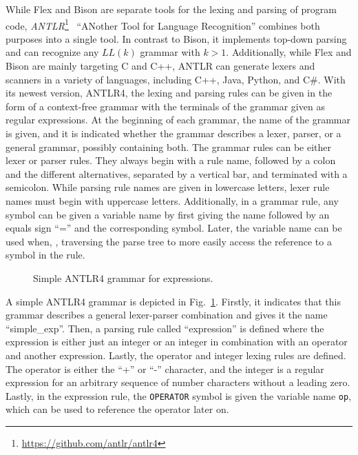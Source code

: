 While Flex and Bison are separate tools for the lexing and parsing of program code, \emph{ANTLR}\footnote{\url{https://github.com/antlr/antlr4}}~\cite{PaQu95} ``ANother Tool for Language Recognition'' combines both purposes into a single tool. In contrast to Bison, it implements top-down parsing and can recognize any $LL(k)$ grammar with $k > 1$. Additionally, while Flex and Bison are mainly targeting C and C++, ANTLR can generate lexers and scanners in a variety of languages, including C++, Java, Python, and C\#.
With its newest version, ANTLR4, the lexing and parsing rules can be given in the form of a context-free grammar with the terminals of the grammar given as regular expressions. At the beginning of each grammar, the name of the grammar is given, and it is indicated whether the grammar describes a lexer, parser, or a general grammar, possibly containing both. The grammar rules can be either lexer or parser rules. They always begin with a rule name, followed by a colon and the different alternatives, separated by a vertical bar, and terminated with a semicolon. While parsing rule names are given in lowercase letters, lexer rule names must begin with uppercase letters.
Additionally, in a grammar rule, any symbol can be given a variable name by first giving the name followed by an equals sign ``='' and the corresponding symbol. Later, the variable name can be used when, \eg, traversing the parse tree to more easily access the reference to a symbol in the rule.

\begin{figure}[htp]
    \centering
    
    \caption{Simple ANTLR4 grammar for expressions.}
    \label{fig:example_antlr4}
\end{figure}

A simple ANTLR4 grammar is depicted in Fig.~\ref{fig:example_antlr4}. Firstly, it indicates that this grammar describes a general lexer-parser combination and gives it the name \mbox{``simple\_exp''}. Then, a parsing rule called ``expression'' is defined where the expression is either just an integer or an integer in combination with an operator and another expression. Lastly, the operator and integer lexing rules are defined. The operator is either the ``+'' or ``-'' character, and the integer is a regular expression for an arbitrary sequence of number characters without a leading zero. Lastly, in the expression rule, the \texttt{OPERATOR} symbol is given the variable name \texttt{op}, which can be used to reference the operator later on.